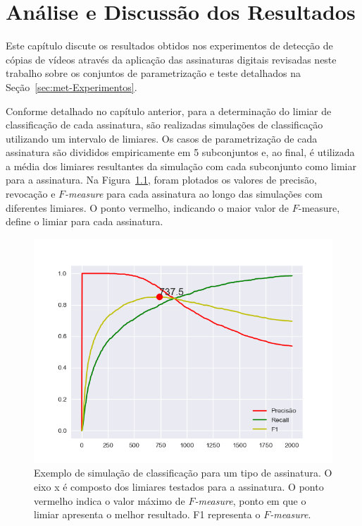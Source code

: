 
\chapter{Análise e Discussão dos Resultados}
\label{chap:resultados}

Este capítulo discute os resultados obtidos nos experimentos de detecção de cópias de vídeos através da aplicação das assinaturas digitais revisadas neste trabalho sobre os conjuntos de parametrização e teste detalhados na Seção~\ref{sec:met-Experimentos}.

Conforme detalhado no capítulo anterior, para a determinação do limiar de classificação de cada assinatura, são realizadas simulações de classificação utilizando um intervalo de limiares. Os casos de parametrização de cada assinatura são divididos empiricamente em 5 subconjuntos e, ao final, é utilizada a média dos limiares resultantes da simulação com cada subconjunto como limiar para a assinatura. Na Figura~\ref{fig:exemplo-simulacao}, foram plotados os valores de precisão, revocação e \textit{$F$-measure} para cada assinatura ao longo das simulações com diferentes limiares. O ponto vermelho, indicando o maior valor de $F$-measure, define o limiar para cada assinatura.

\begin{figure}[h]
	\centering
	\caption{Exemplo de simulação de classificação para um tipo de assinatura. O eixo x é composto dos limiares testados para a assinatura. O ponto vermelho indica o valor máximo de \textit{$F$-measure}, ponto em que o limiar apresenta o melhor resultado. F1 representa o \textit{$F$-measure}.}
	\label{fig:exemplo-simulacao}
	\includegraphics[width=\textwidth]{dados/figuras/experimentos/limiar_Medida_Ordinal_0.png}
\end{figure}


